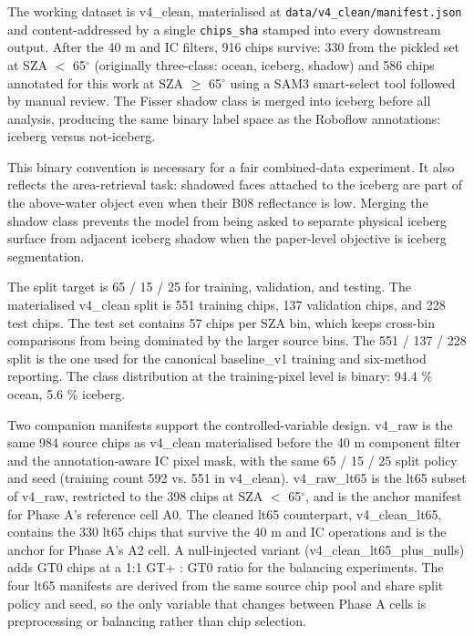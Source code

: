 \documentclass[review,jog]{igs}
\begin{document}
The working dataset is v4\_clean, materialised at \texttt{data/v4\_clean/manifest.json} and content-addressed by a single \texttt{chips\_sha} stamped into every downstream output. After the 40 m and IC filters, 916 chips survive: 330 from the \citet{Fisser2024} pickled set at SZA $<$ 65$^\circ$ (originally three-class: ocean, iceberg, shadow) and 586 chips annotated for this work at SZA $\geq$ 65$^\circ$ using a SAM3 smart-select tool followed by manual review. The Fisser shadow class is merged into iceberg before all analysis, producing the same binary label space as the Roboflow annotations: iceberg versus not-iceberg.

This binary convention is necessary for a fair combined-data experiment. It also reflects the area-retrieval task: shadowed faces attached to the iceberg are part of the above-water object even when their B08 reflectance is low. Merging the shadow class prevents the model from being asked to separate physical iceberg surface from adjacent iceberg shadow when the paper-level objective is iceberg segmentation.

The split target is 65 / 15 / 25 for training, validation, and testing. The materialised v4\_clean split is 551 training chips, 137 validation chips, and 228 test chips. The test set contains 57 chips per SZA bin, which keeps cross-bin comparisons from being dominated by the larger source bins. The 551 / 137 / 228 split is the one used for the canonical baseline\_v1 training and six-method reporting. The class distribution at the training-pixel level is binary: 94.4 \% ocean, 5.6 \% iceberg.

Two companion manifests support the controlled-variable design. v4\_raw is the same 984 source chips as v4\_clean materialised before the 40 m component filter and the annotation-aware IC pixel mask, with the same 65 / 15 / 25 split policy and seed (training count 592 vs. 551 in v4\_clean). v4\_raw\_lt65 is the lt65 subset of v4\_raw, restricted to the 398 \citet{Fisser2024} chips at SZA $<$ 65$^\circ$, and is the anchor manifest for Phase A's reference cell A0. The cleaned lt65 counterpart, v4\_clean\_lt65, contains the 330 lt65 chips that survive the 40 m and IC operations and is the anchor for Phase A's A2 cell. A null-injected variant (v4\_clean\_lt65\_plus\_nulls) adds GT0 chips at a 1:1 GT$+$ : GT0 ratio for the balancing experiments. The four lt65 manifests are derived from the same source chip pool and share split policy and seed, so the only variable that changes between Phase A cells is preprocessing or balancing rather than chip selection.
\end{document}
